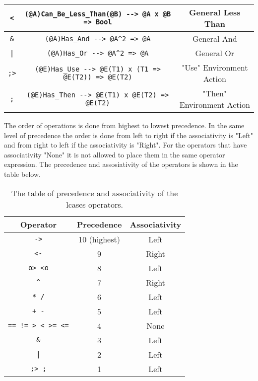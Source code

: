 \documentclass{article}
\begin{document}
\begin{table}[h]
\begin{center}
\begin{tabular}{ |c|c|c| }
\verb|<| & \verb|(@A)Can_Be_Less_Than(@B) --> @A x @B => Bool| &
General Less Than
\\
\hline
\verb|&| & \verb|(@A)Has_And --> @A^2 => @A| & General And
\\
\hline
\texttt{|} & \verb|(@A)Has_Or --> @A^2 => @A| & General Or
\\
\hline
\verb|;>| & \verb|(@E)Has_Use --> @E(T1) x (T1 => @E(T2)) => @E(T2)| &
"Use" Environment Action
\\
\hline
\verb|;| & \verb|(@E)Has_Then --> @E(T1) x @E(T2) => @E(T2)| &
"Then" Environment Action
\\
\hline
\end{tabular}
\end{center}

\label{table:allops}

\end{table}
\newpage\noindent
The order of operations is done from highest to lowest precedence. In the same
level of precedence the order is done from left to right if the associativity
is "Left" and from right to left if the associativity is "Right". For the
operators that have associativity "None" it is not allowed to place them in the
same operator expression. The precedence and assosiativity of the operators
is shown in the table below.

\begin{table}[h]

\caption{ The table of precedence and associativity of the lcases operators.  }

\begin{center}
\begin{tabular}{ |c|c|c| } 
\hline
Operator & Precedence & Associativity
\\ 
\hline
\hline
\verb|->| & 10 (highest) & Left
\\
\hline
\verb|<-| & 9 & Right
\\
\hline
\verb|o> <o| & 8 & Left
\\
\hline
\verb|^| & 7 & Right
\\
\hline
\verb|* /| & 6 & Left
\\
\hline
\verb|+ -| & 5 & Left
\\ 
\hline
\verb|== != > < >= <=| & 4 & None
\\
\hline
\verb|&| & 3 & Left
\\
\hline
\texttt{|} & 2 & Left
\\
\hline
\verb|;> ;| & 1 & Left
\\
\hline
\end{tabular}
\end{center}

\label{table:precassoc}

\end{table}
\end{document}
